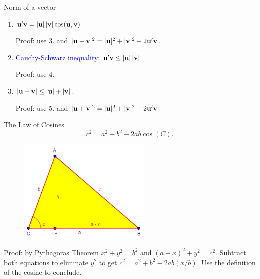 \documentclass[11pt,aspectratio=169]{beamer}
\begin{document}
\begin{frame}{Norm of a vector}
\begin{enumerate}
\item ${\bf u}' {\bf v} = \vert {\bf u}\vert \, \vert {\bf v} \vert \cos ({\bf u}, {\bf v})$
\begin{tiny}Proof: use 3. and  $\vert {\bf u}- {\bf v}\vert^2=\vert {\bf u} \vert^2 +\vert {\bf v}\vert^2-2 {\bf u}' {\bf v}$. \end{tiny}

\item \textcolor{blue}{Cauchy-Schwarz inequality:} $ {\bf u}' {\bf v} \leq  \vert {\bf u} \vert \, \vert {\bf v} \vert$ \begin{tiny}Proof: use 4.\end{tiny}

\item $\vert {\bf u} +{\bf v}\vert\leq \vert {\bf u}\vert +\vert {\bf v}\vert$. \begin{tiny}Proof: use 5. and $\vert {\bf u}+ {\bf v}\vert^2=\vert {\bf u} \vert^2 +\vert {\bf v}\vert^2+2 {\bf u}' {\bf v}$ \end{tiny}
\end{enumerate}\end{frame}


\begin{frame}{The Law of Cosines}
$$
c^2=a^2+b^2-2ab \cos(C).
$$
\begin{figure}
\includegraphics[width=2.5in]{img/cos} 
\end{figure}
\begin{tiny}Proof: by Pythagoras Theorem $x^2+y^2=b^2$ and $(a-x)^2+y^2=c^2$. Subtract
both equations to eliminate $y^2$ to get $c^2=a^2+b^2-2ab (x/b)$. Use the definition of the  cosine to conclude.\end{tiny}\end{frame}
\end{document}
